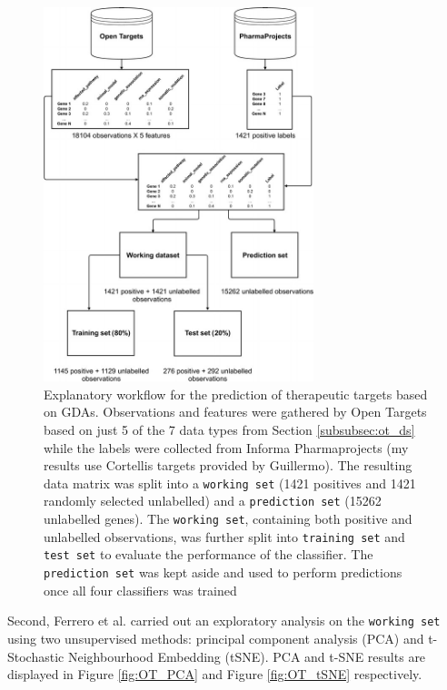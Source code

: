 \begin{figure}[H]
    \centering
    \includegraphics[width=0.7\textwidth]{pics/workflowOpenTargets.jpg}
    \caption{Explanatory workflow for the prediction of therapeutic targets based on GDAs. Observations and features were gathered by Open Targets based on just 5 of the 7 data types from Section \ref{subsubsec:ot_ds} while the labels were collected from Informa Pharmaprojects \cite{pharmaProjects} (my results use Cortellis targets provided by Guillermo). The resulting data matrix was split into a \texttt{working set} (1421 positives and 1421 randomly selected unlabelled) and a \texttt{prediction set} (15262 unlabelled genes). The \texttt{working set}, containing both positive and unlabelled observations, was further split into \texttt{training set} and \texttt{test set} to evaluate the performance of the classifier. The \texttt{prediction set} was kept aside and used to perform predictions once all four classifiers was trained}
    \label{fig:ot_workflow}
\end{figure}

Second, Ferrero et al. \cite{ferrero2017} carried out an exploratory analysis on the \texttt{working set} using two unsupervised methods: principal component analysis (PCA) and t-Stochastic Neighbourhood Embedding (tSNE). PCA and t-SNE results are displayed in Figure \ref{fig:OT_PCA} and Figure \ref{fig:OT_tSNE} respectively.

